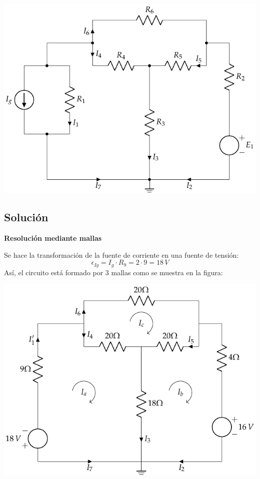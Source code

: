      \begin{center}
       \includegraphics{figuras/BT1_12.pdf}
     \end{center}

     \subsection*{Solución}

     \textbf{Resolución mediante mallas}

     Se hace la transformación de la fuente de corriente en una fuente
     de tensión:
     \begin{equation*}
       \epsilon_{Ig}=I_g\cdot R_9=2\cdot 9=18\,V
     \end{equation*}
     Así, el circuito está formado por 3 mallas como se muestra en la
     figura:
     \begin{center}
       \includegraphics{figuras/BT1_12_mallas.pdf}
     \end{center}
     
